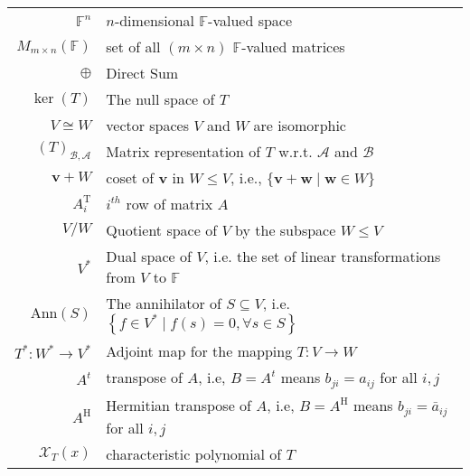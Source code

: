 \documentclass[11pt]{article}
\begin{document}
\begin{tabular}{rl}
\({\mathbb{F}}^n\) & \(n\)-dimensional \(\mathbb{F}\)-valued space\\

 \({M}_{m \times  n}\left( \mathbb{F}\right)\) &set of all \((m \times  n)\) \(\mathbb{F}\)-valued matrices\\

 \(\oplus  \) & Direct Sum \\

 \(\ker \left( T\right) \) & The null space of \(T\)\\

 \(V \cong  W\) & vector spaces \(V\) and \(W\) are isomorphic\\

 \({\left( T\right) }_{\mathcal{B},\mathcal{A}}\) & Matrix representation of \(T\) w.r.t. \(\mathcal{A}\) and \(\mathcal{B}\)\\

 \(\mathbf{v} + W\) & coset of \(\mathbf{v}\) in $W \leq V$, i.e., \(\{ \mathbf{v} + \mathbf{w} \mid  \mathbf{w} \in  W\}\)\\

 \({A}_{i}^{\mathrm{T}}\)& \(i^{th}\) row of matrix \(A\)\\

  \(V/W\) & Quotient space of \(V\) by the subspace \(W \leq V\)\\

  \(V^*\)& Dual space of \(V\), i.e. the set of linear transformations from \(V\) to \(\mathbb{F}\)\\

  \(\mathrm{Ann}\left( S\right) \) & The annihilator of \(S \subseteq  V\), i.e. \(\left\{  {f \in  {V}^{ * } \mid  f\left( s\right)  = 0,\forall s \in  S}\right\}\)\\

 \({T}^{ * } : {W}^{ * } \rightarrow  {V}^{ * }\) & Adjoint map  for the mapping \(T : V \rightarrow  W\)\\

\(A^t\) & transpose of \(A\), i.e, \(B = A^t\) means \({b}_{ji} = {{a}}_{ij}\) for all \(i,j\)\\

 \(A^{\mathrm{H}}\) & Hermitian transpose of \(A\), i.e, \(B = A^{\mathrm{H}}\) means \({b}_{ji} = {\bar{a}}_{ij}\) for all \(i,j\)\\

 \({\mathcal{X}}_{T}\left( x\right) \) & characteristic polynomial of \(T\)\\


\end{tabular}
\end{document}
